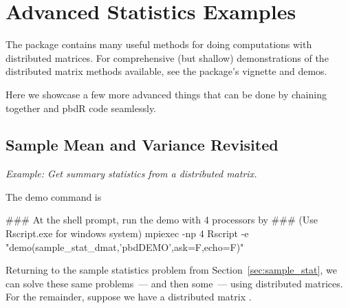 
\chapter{Advanced Statistics Examples}

The  package contains many useful methods for doing computations with distributed matrices.  For comprehensive (but shallow) demonstrations of the distributed matrix methods available, see the  package's vignette and demos.

Here we showcase a few more advanced things that can be done by chaining together  and pbdR code seamlessly.





\section{Sample Mean and Variance Revisited}

\emph{Example:  Get summary statistics from a distributed matrix.}

The demo command is
\begin{Command}
### At the shell prompt, run the demo with 4 processors by
### (Use Rscript.exe for windows system)
mpiexec -np 4 Rscript -e "demo(sample_stat_dmat,'pbdDEMO',ask=F,echo=F)"
\end{Command}

Returning to the sample statistics problem from Section~\ref{sec:sample_stat}, we can solve these same problems~--- and then some~--- using distributed matrices.  For the remainder, suppose we have a distributed matrix .

